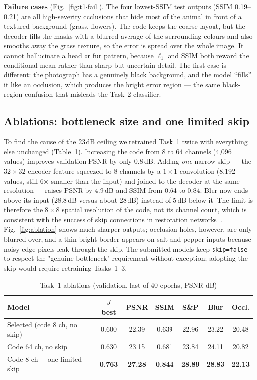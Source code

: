 \documentclass[conference]{IEEEtran}
\begin{document}
\textbf{Failure cases} (Fig.~\ref{fig:t1-fail}). The four lowest-SSIM test outputs (SSIM 0.19--0.21) are all
high-severity occlusions that hide most of the animal in front of a textured background (grass, flowers). The code
keeps the coarse layout, but the decoder fills the masks with a blurred average of the surrounding colours and also
smooths away the grass texture, so the error is spread over the whole image. It cannot hallucinate a head or fur
pattern, because $\ell_1$ and SSIM both reward the conditional mean rather than sharp but uncertain detail. The first
case is different: the photograph has a genuinely black background, and the model ``fills'' it like an occlusion,
which produces the bright error region --- the same black-region confusion that misleads the Task~2 classifier.

\subsection{Ablations: bottleneck size and one limited skip}\label{sec:ablation}
To find the cause of the 23\,dB ceiling we retrained Task~1 twice with everything else unchanged
(Table~\ref{tab:ablation}). Increasing the code from 8 to 64 channels (4,096 values) improves validation PSNR by only
0.8\,dB. Adding \emph{one} narrow skip --- the $32\times32$ encoder feature squeezed to 8 channels by a $1\times1$
convolution (8,192 values, still 6$\times$ smaller than the input) and joined to the decoder at the same resolution
--- raises PSNR by 4.9\,dB and SSIM from 0.64 to 0.84. Blur now ends above its input (28.8\,dB versus about 28\,dB)
instead of 5\,dB below it. The limit is therefore the $8\times8$ spatial resolution of the code, not its channel
count, which is consistent with the success of skip connections in restoration networks~\cite{mao2016}. Fig.~\ref{fig:ablation}
shows much sharper outputs; occlusion holes, however, are only blurred over, and a thin bright border appears on
salt-and-pepper inputs because noisy edge pixels leak through the skip. The submitted models keep
\texttt{skip=false} to respect the "genuine bottleneck" requirement without exception; adopting the skip would
require retraining Tasks~1--3.

\begin{table}[!htbp]
\centering\caption{Task~1 ablations (validation, last of 40 epochs, PSNR dB)}\label{tab:ablation}
\scriptsize\setlength{\tabcolsep}{3pt}
\begin{tabular}{@{}lcccccc@{}}
\toprule
Model & $J$ best & PSNR & SSIM & S\&P & Blur & Occl.\\
\midrule
Selected (code 8 ch, no skip) & 0.600 & 22.39 & 0.639 & 22.96 & 23.22 & 20.48\\
Code 64 ch, no skip & 0.630 & 23.15 & 0.681 & 23.84 & 24.11 & 20.82\\
Code 8 ch + one limited skip & \textbf{0.763} & \textbf{27.28} & \textbf{0.844} & \textbf{28.89} & \textbf{28.83} & \textbf{22.13}\\
\bottomrule
\end{tabular}
\end{table}
\end{document}
